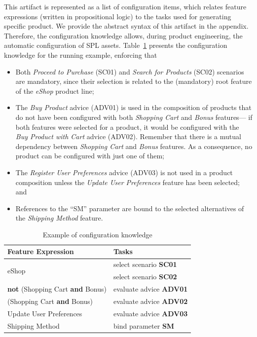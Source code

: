 This artifact is represented as a list of configuration items, which relates
feature expressions (written in propositional logic) to the tasks used for
generating specific product. We provide the abstract syntax of this artifact in the appendix. Therefore, the configuration knowledge allows,
during product engineering, the automatic configuration of SPL assets.
Table~\ref{tab:eshop-ck} presents the configuration
knowledge for the running example, enforcing that


\begin{itemize}
\item Both \emph{Proceed to Purchase} (SC01) and \emph{Search for Products}
(SC02) scenarios are mandatory, since their selection is related to the
(mandatory) root feature of the \emph{eShop} product line;

\item The \emph{Buy Product} advice (ADV01) is used in the composition of
products that do not have been configured with both \emph{Shopping Cart} and \emph{Bonus}
features--- if both features were selected for a product, it would be configured
with the \emph{Buy Product with Cart} advice (ADV02). Remember that there is a
mutual dependency between \emph{Shopping Cart} and \emph{Bonus} features. As a
consequence, no product can be configured with just one of them;

\item The \emph{Register User Preferences} advice (ADV03) is not used in a
product composition unless the \emph{Update User Preferences} feature has been
selected; and

\item References to the ``SM'' parameter are bound to the
selected alternatives of the \emph{Shipping Method} feature.

\end{itemize}


\begin{table}[htb]
\begin{small}
\begin{tabular}{||lp{1.4in}||}
\hline
Feature Expression  						& Tasks					 \\ \hline

\multirow{2}{*}{eShop}						& select scenario {\bf SC01} \\
											& select scenario {\bf SC02} \\	\hline
{\bf not} (Shopping Cart {\bf and} Bonus) 	& evaluate advice {\bf ADV01} \\
\hline (Shopping Cart {\bf and} Bonus) 		& evaluate advice {\bf ADV02} 	\\
\hline Update User Preferences 				& evaluate advice {\bf ADV03} \\ \hline
Shipping Method								& bind parameter {\bf SM}\\ \hline
								
\end{tabular}
\end{small}
\caption{Example of configuration knowledge}
\label{tab:eshop-ck}
\end{table}

